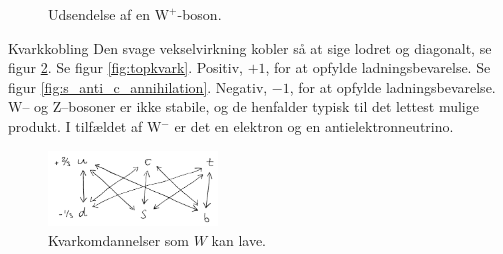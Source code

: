 \begin{figure}[h!]
        \centering
        \caption{Udsendelse af en $\mathrm{W}^+$-boson.}
        \label{fig:Wvertex_rot}
    \end{figure}

\begin{opgave}{Kvarkkobling} \label{opg:Kvarkkobling}
    \opg Den svage vekselvirkning kobler så at sige lodret og diagonalt, se figur \ref{fig:opg35}.
    \opg Se figur \ref{fig:topkvark}.
    \opg Positiv, $+1$, for at opfylde ladningsbevarelse.
    \opg Se figur \ref{fig:s_anti_c_annihilation}.
    \opg Negativ, $-1$, for at opfylde ladningsbevarelse.
    \opg W-- og Z--bosoner er ikke stabile, og de henfalder typisk til det lettest mulige produkt. I tilfældet af W$^-$ er det en elektron og en antielektronneutrino.
\end{opgave}

\begin{figure} [h!]
  \centering
  \includegraphics[width=0.4\textwidth]{facit/figurer/kvarkkobling.png}
  \caption{Kvarkomdannelser som $W$ kan lave.}
  \label{fig:opg35}
\end{figure}

